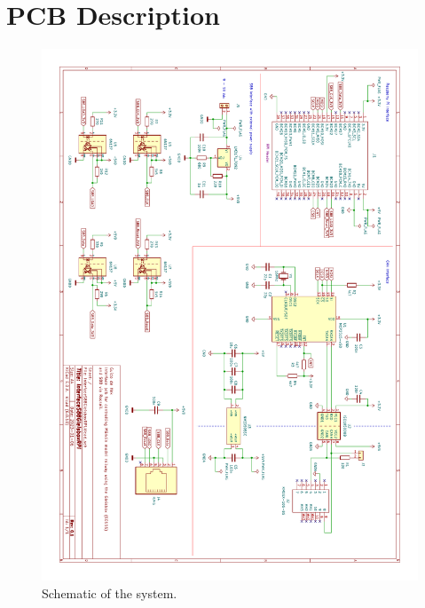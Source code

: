 \section{PCB Description}

\begin{figure}[h!]
	\centering
	\includegraphics[width=1.00\linewidth]{../../pcb/InterfaceS88GleisboxRPi/InterfaceS88GleisboxRPi.pdf}
	\caption{Schematic of the system.}
	\label{fig:pcbschematic}
\end{figure}